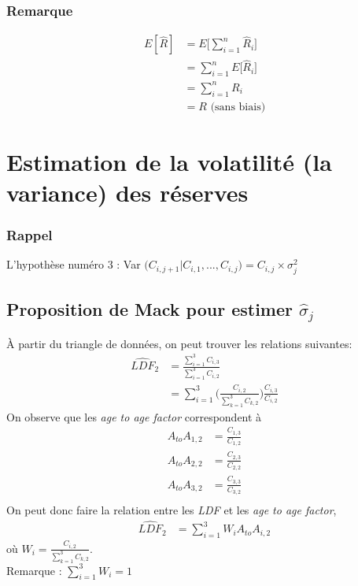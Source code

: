 \subsubsection*{Remarque}
\begin{align*}
E[\widehat{R}] &= E \Big[ \sum_{i=1}^{n} \widehat{R}_i \Big] \\
&= \sum_{i=1}^{n} E \Big[  \widehat{R}_i \Big] \\
&= \sum_{i=1}^{n} R_i \\
&= R \text{  (sans biais)}
\end{align*}

\section*{Estimation de la volatilité (la variance) des réserves}
\subsubsection*{Rappel}
L'hypothèse numéro 3 : Var $\Big( C_{i, j+1} | C_{i,1}, ..., C_{i,j}\Big) = C_{i,j} \times \sigma_j^2$

\subsection*{Proposition de Mack pour estimer $\widehat{\sigma}_j$}
À partir du triangle de données, on peut trouver les relations suivantes:
\begin{align*}
\widehat{LDF}_2 &= \frac{\sum_{i=1}^{3} C_{i,3}}{\sum_{i=1}^{3} C_{i,2}} \\
&= \sum_{i=1}^{3} \Bigg( \frac{C_{i,2}}{\sum_{k=1}^{3}C_{k,2}}\Bigg) \frac{C_{i,3}}{C_{i,2}}
\end{align*}
On observe que les \emph{age to age factor} correspondent à
\begin{align*}
A_{to}A_{1,2} &= \frac{C_{1,3}}{C_{1,2}} \\
A_{to}A_{2,2} &= \frac{C_{2,3}}{C_{2,2}} \\
A_{to}A_{3,2} &= \frac{C_{3,3}}{C_{3,2}} \\
\end{align*}
On peut donc faire la relation entre les \emph{LDF} et les \emph{age to age factor},
\begin{align*}
\widehat{LDF}_2 &= \sum_{i=1}^{3} W_i A_{to}A_{i,2}
\end{align*}
où $ W_i = \frac{C_{i,2}}{\sum_{k=1}^{3}C_{k,2}}$.
\\
Remarque : $\sum_{i=1}^{3} W_i= 1$

